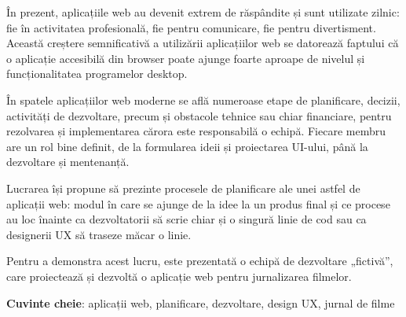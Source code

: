 În prezent, aplicațiile web au devenit extrem de răspândite și sunt utilizate zilnic: fie în activitatea profesională, fie pentru comunicare, fie pentru divertisment. Această creștere semnificativă a utilizării aplicațiilor web se datorează faptului că o aplicație accesibilă din browser poate ajunge foarte aproape de nivelul și funcționalitatea programelor desktop.

În spatele aplicațiilor web moderne se află numeroase etape de planificare, decizii, activități de dezvoltare, precum și obstacole tehnice sau chiar financiare, pentru rezolvarea și implementarea cărora este responsabilă o echipă. Fiecare membru are un rol bine definit, de la formularea ideii și proiectarea UI-ului, până la dezvoltare și mentenanță.

Lucrarea își propune să prezinte procesele de planificare ale unei astfel de aplicații web: modul în care se ajunge de la idee la un produs final și ce procese au loc înainte ca dezvoltatorii să scrie chiar și o singură linie de cod sau ca designerii UX să traseze măcar o linie.

Pentru a demonstra acest lucru, este prezentată o echipă de dezvoltare „fictivă”, care proiectează și dezvoltă o aplicație web pentru jurnalizarea filmelor.

\textbf{Cuvinte cheie}: aplicații web, planificare, dezvoltare, design UX, jurnal de filme

